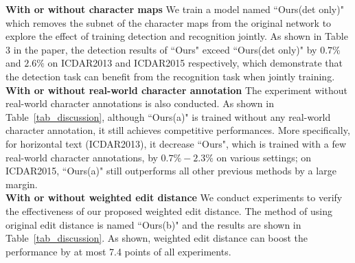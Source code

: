 \documentclass[runningheads]{llncs}
\begin{document}
\noindent\textbf{With or without character maps} We train a model named ``Ours(det only)" which removes the subnet of the character maps from the original network to explore the effect of training detection and recognition jointly. As shown in Table 3 in the paper, the detection results of ``Ours" exceed ``Ours(det only)" by $0.7\%$ and $2.6\%$ on ICDAR2013 and ICDAR2015 respectively,  which demonstrate that the detection task can  benefit from the recognition task when jointly training.
\\
\textbf{With or without real-world character annotation} The experiment without real-world character annotations is also conducted. As shown in Table~\ref{tab_discussion},  although ``Ours(a)" is trained without any real-world character annotation, it still achieves competitive performances. More specifically, for horizontal text (ICDAR2013), it decrease ``Ours", which is trained with a few real-world character annotations, by  $0.7\%-2.3\%$ on various settings; on ICDAR2015, ``Ours(a)" still outperforms all other previous methods by a large margin.
\\
\textbf{With or without weighted edit distance} We conduct experiments to verify the effectiveness of our proposed weighted edit distance. The method of using original edit distance is named ``Ours(b)" and the results are shown in Table~\ref{tab_discussion}. As shown, weighted edit distance can boost the performance by at most 7.4 points of all experiments. %
\end{document}
